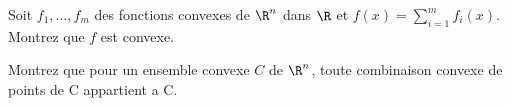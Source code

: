

\item Soit $f_1, \ldots, f_m$ des fonctions convexes de $\R^n$ dans $\R$ et $f(x)=
  \sum_{i=1}^m f_i(x)$. Montrez que $f$ est convexe.


\item Montrez que pour un ensemble convexe $C$ de $\R^n$, toute combinaison convexe
  de points de C appartient a C.
